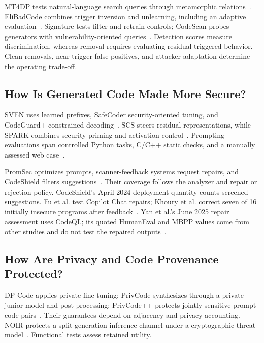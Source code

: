 \documentclass[acmsmall,screen,review,nonacm]{acmart}
\begin{document}
MT4DP tests natural-language search queries through metamorphic relations~\cite{mt4dp2025}. EliBadCode combines trigger inversion and unlearning, including an adaptive evaluation~\cite{sun2025elibadcode}. Signature tests filter-and-retrain controls; CodeScan probes generators with vulnerability-oriented queries~\cite{le2025signature,yan2026codescan}. Detection scores measure discrimination, whereas removal requires evaluating residual triggered behavior. Clean removals, near-trigger false positives, and attacker adaptation determine the operating trade-off.

\subsection{How Is Generated Code Made More Secure?} \label{sec:defense:gen}
SVEN uses learned prefixes, SafeCoder security-oriented tuning, and CodeGuard+ constrained decoding~\cite{he2023sven,he2024safecoder,codeguard2024}. SCS steers residual representations, while SPARK combines security priming and activation control~\cite{wendlinger2026scs,spark2026}. Prompting evaluations span controlled Python tasks, C/C++ static checks, and a manually assessed web case~\cite{tony2024prompting,shahid2025llmcsec,jamdade2024pilot}.

PromSec optimizes prompts, scanner-feedback systems request repairs, and CodeShield filters suggestions~\cite{promsec2024,guiding2025fix,codeshield2024}. Their coverage follows the analyzer and repair or rejection policy. CodeShield's April 2024 deployment quantity counts screened suggestions. Fu et al. test Copilot Chat repairs; Khoury et al. correct seven of 16 initially insecure programs after feedback~\cite{fu2023security,khoury2023secure}. Yan et al.'s June 2025 repair assessment uses CodeQL; its quoted HumanEval and MBPP values come from other studies and do not test the repaired outputs~\cite{guiding2025fix}.

\subsection{How Are Privacy and Code Provenance Protected?}
DP-Code applies private fine-tuning; PrivCode synthesizes through a private junior model and post-processing; PrivCode++ protects jointly sensitive prompt--code pairs~\cite{dpcode2025,privcode2026,privcodeplus2026}. Their guarantees depend on adjacency and privacy accounting. NOIR protects a split-generation inference channel under a cryptographic threat model~\cite{noir2026}. Functional tests assess retained utility.
\end{document}
